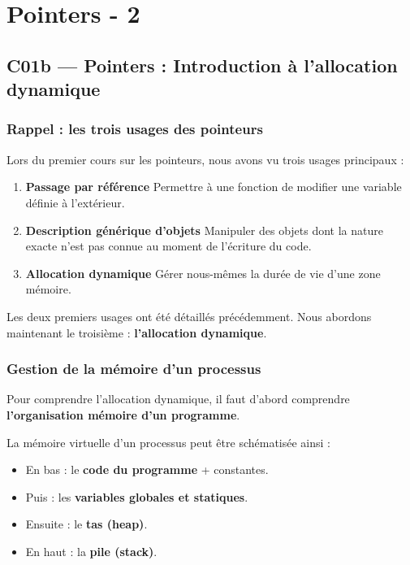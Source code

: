 
\chapter{Pointers - 2}\label{chap:pointers_} %

\section{C01b — Pointers : Introduction à l’allocation dynamique}

\subsection{Rappel : les trois usages des pointeurs}

Lors du premier cours sur les pointeurs, nous avons vu trois usages principaux :

\begin{enumerate}
    \item \textbf{Passage par référence}  
    Permettre à une fonction de modifier une variable définie à l’extérieur.

    \item \textbf{Description générique d’objets}  
    Manipuler des objets dont la nature exacte n’est pas connue au moment de l’écriture du code.

    \item \textbf{Allocation dynamique}  
    Gérer nous-mêmes la durée de vie d’une zone mémoire.
\end{enumerate}

Les deux premiers usages ont été détaillés précédemment.  
Nous abordons maintenant le troisième : \textbf{l’allocation dynamique}.

\subsection{Gestion de la mémoire d’un processus}

Pour comprendre l’allocation dynamique, il faut d’abord comprendre 
\textbf{l’organisation mémoire d’un programme}.

La mémoire virtuelle d’un processus peut être schématisée ainsi :

\begin{itemize}
    \item En bas : le \textbf{code du programme} + constantes.
    \item Puis : les \textbf{variables globales et statiques}.
    \item Ensuite : le \textbf{tas (heap)}.
    \item En haut : la \textbf{pile (stack)}.
\end{itemize}

